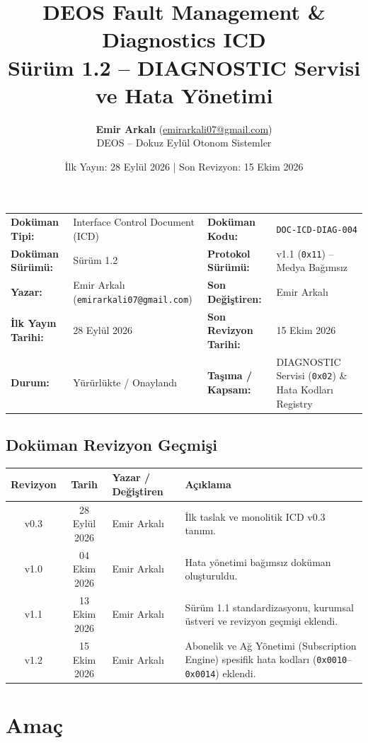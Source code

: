 \documentclass[a4paper,11pt]{article}
\title{\textbf{DEOS Fault Management \& Diagnostics ICD}\\
\large Sürüm 1.2 -- DIAGNOSTIC Servisi ve Hata Yönetimi}
\author{\textbf{Emir Arkalı} (\href{mailto:emirarkali07@gmail.com}{emirarkali07@gmail.com})\\DEOS -- Dokuz Eylül Otonom Sistemler}
\date{İlk Yayın: 28 Eylül 2026 \quad | \quad Son Revizyon: 15 Ekim 2026}
\newcommand{\hex}[1]{\texttt{0x#1}}
\newcommand{\code}[1]{\texttt{#1}}
\begin{document}
\maketitle

\begin{center}
\small
\begin{tabularx}{\textwidth}{ll lX}
\toprule
\textbf{Doküman Tipi:} & Interface Control Document (ICD) & \textbf{Doküman Kodu:} & \code{DOC-ICD-DIAG-004} \\
\textbf{Doküman Sürümü:} & Sürüm 1.2 & \textbf{Protokol Sürümü:} & v1.1 (\hex{11}) -- Medya Bağımsız \\
\textbf{Yazar:} & Emir Arkalı (\texttt{emirarkali07@gmail.com}) & \textbf{Son Değiştiren:} & Emir Arkalı \\
\textbf{İlk Yayın Tarihi:} & 28 Eylül 2026 & \textbf{Son Revizyon Tarihi:} & 15 Ekim 2026 \\
\textbf{Durum:} & Yürürlükte / Onaylandı & \textbf{Taşıma / Kapsam:} & DIAGNOSTIC Servisi (\hex{02}) \& Hata Kodları Registry \\
\bottomrule
\end{tabularx}
\end{center}

\subsection*{Doküman Revizyon Geçmişi}
\begin{center}
\small
\begin{tabularx}{\textwidth}{c c l X}
\toprule
\textbf{Revizyon} & \textbf{Tarih} & \textbf{Yazar / Değiştiren} & \textbf{Açıklama} \\
\midrule
v0.3 & 28 Eylül 2026 & Emir Arkalı & İlk taslak ve monolitik ICD v0.3 tanımı. \\
v1.0 & 04 Ekim 2026 & Emir Arkalı & Hata yönetimi bağımsız doküman oluşturuldu. \\
v1.1 & 13 Ekim 2026 & Emir Arkalı & Sürüm 1.1 standardizasyonu, kurumsal üstveri ve revizyon geçmişi eklendi. \\
v1.2 & 15 Ekim 2026 & Emir Arkalı & Abonelik ve Ağ Yönetimi (Subscription Engine) spesifik hata kodları (\hex{0010}--\hex{0014}) eklendi. \\
\bottomrule
\end{tabularx}
\end{center}
\vspace{0.8em}

\section{Amaç}
\end{document}
